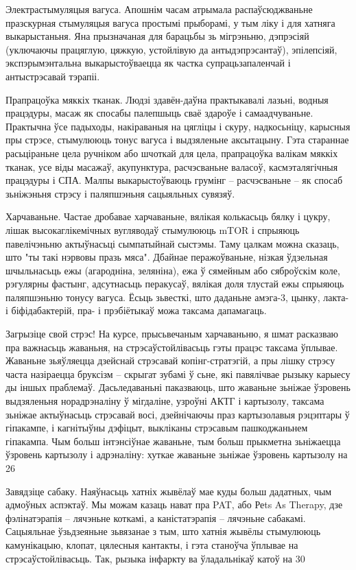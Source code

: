 Электрастымуляцыя вагуса. Апошнім часам атрымала распаўсюджваньне празскурная стымуляцыя вагуса простымі прыборамі, у тым ліку і для хатняга выкарыстаньня. Яна прызначаная для барацьбы зь мігрэньню, дэпрэсіяй (уключаючы працяглую, цяжкую, устойлівую да антыдэпрэсантаў), эпілепсіяй, экспэрымэнтальна выкарыстоўваецца як частка супрацьзапаленчай і антыстрэсавай тэрапіі.

Прапрацоўка мяккіх тканак. Людзі здавён-даўна практыкавалі лазьні, водныя працэдуры, масаж як спосабы палепшыць сваё здароўе і самаадчуваньне. Практычна ўсе падыходы, накіраваныя на цягліцы і скуру, надкосьніцу, карысныя пры стрэсе, стымулююць тонус вагуса і выдзяленьне аксытацыну. Гэта стараннае расьціраньне цела ручніком або шчоткай для цела, прапрацоўка валікам мяккіх тканак, усе віды масажаў, акупунктура, расчэсваньне валасоў, касмэталягічныя працэдуры і СПА. Малпы выкарыстоўваюць грумінг – расчэсваньне – як спосаб зьніжэньня стрэсу і паляпшэньня сацыяльных сувязяў.

Харчаваньне. Частае дробавае харчаваньне, вялікая колькасьць бялку і цукру, лішак высокаглікемічных вугляводаў стымулююць mTOR і спрыяюць павелічэньню актыўнасьці сымпатыйнай сыстэмы. Таму цалкам можна сказаць, што "ты такі нэрвовы празь мяса". Дбайнае перажоўваньне, нізкая ўдзельная шчыльнасьць ежы (агародніна, зеляніна), ежа ў сямейным або сяброўскім коле, рэгулярны фастынг, адсутнасьць перакусаў, вялікая доля тлустай ежы спрыяюць паляпшэньню тонусу вагуса. Ёсьць зьвесткі, што даданьне амэга-3, цынку, лакта- і біфідабактерій, пра- і прэбіётыкаў можа таксама дапамагаць.

Загрызіце свой стрэс! На курсе, прысьвечаным харчаваньню, я шмат расказваю пра важнасьць жаваньня, на стрэсаўстойлівасьць гэты працэс таксама ўплывае. Жаваньне зьяўляецца дзейснай стрэсавай копінг-стратэгій, а пры лішку стрэсу часта назіраецца бруксізм – скрыгат зубамі ў сьне, які павялічвае рызыку карыесу ды іншых праблемаў. Дасьледаваньні паказваюць, што жаваньне зьніжае ўзровень выдзяленьня норадрэналіну ў мігдаліне, узроўні АКТГ і картызолу, таксама зьніжае актыўнасьць стрэсавай восі, дзейнічаючы праз картызолавыя рэцэптары ў гіпакампе, і кагнітыўны дэфіцыт, выкліканы стрэсавым пашкоджаньнем гіпакампа. Чым больш інтэнсіўнае жаваньне, тым больш прыкметна зьніжаецца ўзровень картызолу і адрэналіну: хуткае жаваньне зьніжае ўзровень картызолу на 26%

Завядзіце сабаку. Наяўнасьць хатніх жывёлаў мае куды больш дадатных, чым адмоўных аспэктаў. Мы можам казаць нават пра PAT, або Реts As Therapy, дзе фэлінатэрапія – лячэньне коткамі, а каністатэрапія – лячэньне сабакамі. Сацыяльнае ўзьдзеяньне зьвязанае з тым, што хатнія жывёлы стымулююць камунікацыю, клопат, цялесныя кантакты, і гэта станоўча ўплывае на стрэсаўстойлівасьць. Так, рызыка інфаркту ва ўладальнікаў катоў на 30%

